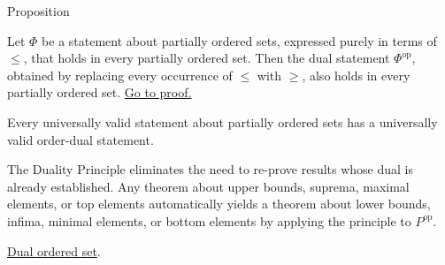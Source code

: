 
\begin{propositionbox}{Proposition}
\begin{proposition}
\label{prop:duality-principle}
Let $\Phi$ be a statement about partially ordered sets, expressed purely
in terms of $\leq$, that holds in every partially ordered set.  Then the
dual statement $\Phi^{\mathrm{op}}$, obtained by replacing every
occurrence of $\leq$ with $\geq$, also holds in every partially ordered
set.
\hyperref[prf:duality-principle]{Go to proof.}
\end{proposition}
\end{propositionbox}

\begin{remark*}
Every universally valid statement about partially ordered sets has a
universally valid order-dual statement.
\end{remark*}

\begin{remark*}[Interpretation]
The Duality Principle eliminates the need to re-prove results whose dual
is already established.  Any theorem about upper bounds, suprema, maximal
elements, or top elements automatically yields a theorem about lower
bounds, infima, minimal elements, or bottom elements by applying the
principle to $P^{\mathrm{op}}$.
\end{remark*}

\begin{dependencies}
\hyperref[def:dual-ordered-set]{Dual ordered set}.
\end{dependencies}
